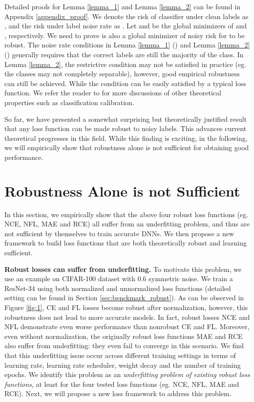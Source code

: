 \documentclass{article}
\begin{document}
Detailed proofs for Lemma \ref{lemma_1} and Lemma \ref{lemma_2} can be found in Appendix \ref{appendix_proof}. 
We denote the risk of classifier  under clean labels as , and the risk under label noise rate  as . Let  and  be the global minimizers of  and , respectively. We need to prove  is also a global minimizer of noisy risk  for  to be robust.  
The noise rate conditions in Lemma \ref{lemma_1} () and Lemma \ref{lemma_2} () generally requires that the correct labels are still the majority of the class. 
In Lemma \ref{lemma_2}, the restrictive condition  may not be satisfied in practice (eg. the classes may not completely separable), however, good empirical robustness can still be achieved.
While the condition  can be easily satisfied by a typical loss function. 
We refer the reader to \cite{charoenphakdee2019symmetric} for more discussions of other theoretical properties such as classification calibration.

So far, we have presented a somewhat surprising but theoretically justified result that any loss function can be made robust to noisy labels. This advances current theoretical progresses in this field. While this finding is exciting, in the following, we will empirically show that robustness alone is not sufficient for obtaining good performance.

\section{Robustness Alone is not Sufficient}\label{sec:pos_neg}
In this section, we empirically show that the above four robust loss functions (eg. NCE, NFL, MAE and RCE) all suffer from an underfitting problem, and thus are not sufficient by themselves to train accurate DNNs. We then propose a new framework to build loss functions that are both theoretically robust and learning sufficient.

\noindent\textbf{Robust losses can suffer from underfitting.}
To motivate this problem, we use an example on CIFAR-100 dataset with 0.6 symmetric noise. We train a ResNet-34 \cite{he2016deep} using both normalized and unnormalized loss functions (detailed setting can be found in Section \ref{sec:benckmark_robust}). As can be observed in Figure \ref{fig:1}, CE and FL losses become robust after normalization, however, this robustness does not lead to more accurate models. In fact, robust losses NCE and NFL demonstrate even worse performance than nonrobust CE and FL. Moreover, even without normalization, the originally robust loss functions MAE and RCE also suffer from underfitting: they even fail to converge in this scenario.
We find that this underfitting issue occur across different training settings in terms of learning rate, learning rate scheduler, weight decay and the number of training epochs.
We identify this problem as an \emph{underfitting problem of existing robust loss functions}, at least for the four tested loss functions (eg. NCE, NFL, MAE and RCE).
Next, we will propose a new loss framework to address this problem.
\end{document}
